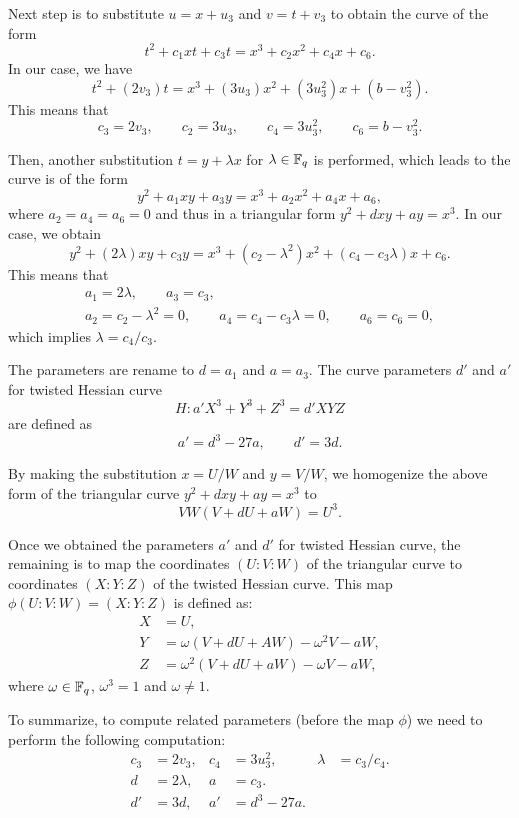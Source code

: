 Next step is to substitute $u = x + u_3$ and $v = t + v_3$
to obtain the curve of the form
$$ t^2 + c_1 xt + c_3 t = x^3 + c_2 x^2 + c_4 x + c_6. $$
In our case, we have
$$ t^2 + (2v_3)t = x^3 + (3u_3)x^2 + (3u_3^2)x + (b-v_3^2). $$
This means that
$$ c_3 = 2v_3, \qquad c_2 = 3u_3, \qquad c_4 = 3u_3^2, \qquad c_6 = b-v_3^2. $$

Then, another substitution $t = y + \lambda x$ for $\lambda \in \mathbb{F}_{q}$ is performed,
which leads to the curve is of the form
$$ y^2 + a_1 xy + a_3 y = x^3 + a_2 x^2 + a_4 x + a_6, $$
where $a_2 = a_4 = a_6 = 0$ and thus in a triangular form
$y^2 + dxy + ay = x^3$.
In our case, we obtain
$$ y^2 + (2\lambda)xy + c_3 y = x^3 + (c_2 - \lambda^2)x^2 + (c_4 - c_3 \lambda)x + c_6. $$
This means that
\begin{gather*}
a_1 = 2\lambda, \qquad a_3 = c_3, \\
a_2 = c_2 - \lambda^2 = 0, \qquad a_4 = c_4 - c_3 \lambda = 0, \qquad a_6 = c_6 = 0,
\end{gather*}
which implies $\lambda = c_4 / c_3$.

The parameters are rename to $d = a_1$ and $a = a_3$.
The curve parameters $d'$ and $a'$ for twisted Hessian curve
$$ H: a'X^3 + Y^3 + Z^3 = d'XYZ$$
are defined as
$$ a' = d^3 - 27a, \qquad d' = 3d. $$

By making the substitution $x = U/W$ and $y = V/W$,
we homogenize the above form of the triangular curve $y^2 + dxy + ay = x^3$ to
$$ VW(V + dU + aW) = U^3. $$

Once we obtained the parameters $a'$ and $d'$ for twisted Hessian curve,
the remaining is to map the coordinates $(U : V : W)$ of the triangular curve
to coordinates $(X : Y : Z)$ of the twisted Hessian curve.
This map $\phi(U:V:W) = (X:Y:Z)$ is defined as:
\begin{align*}
X &= U, \\
Y &= \omega(V + dU + AW) - \omega^2 V - aW, \\
Z &= \omega^2 (V + dU + aW) - \omega V - aW,
\end{align*}
where $\omega \in \mathbb{F}_{q}$, $\omega^3 = 1$ and $\omega \ne 1$.

To summarize, to compute related parameters (before the map $\phi$)
we need to perform the following computation:
\begin{align*}
c_3 &= 2 v_3,	&	c_4 &= 3 u_3^2,		&	\lambda &= c_3 / c_4.	\\
d &= 2 \lambda,	&	a &= c_3.		&	\\
d' &= 3 d,	&	a' &= d^3 - 27 a.	&
\end{align*}

